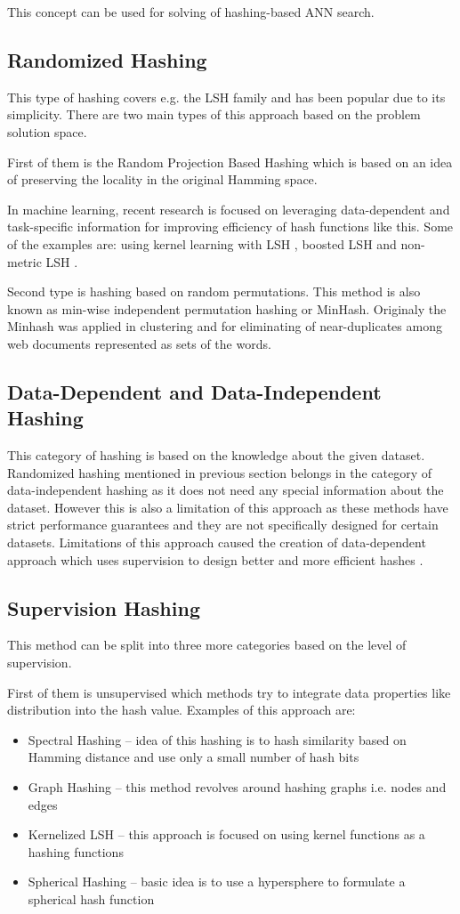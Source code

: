 This concept can be used for solving of hashing-based ANN search.

\subsection{Randomized Hashing}
This type of hashing covers e.g. the LSH family and has been popular due to its simplicity. There are two main types of this approach based on the problem solution space. 

First of them is the Random Projection Based Hashing which is based on an idea of preserving the locality in the original Hamming space.

In machine learning, recent research is focused on leveraging data-dependent and task-specific information for improving efficiency of hash functions like this. Some of the examples are: using kernel learning with LSH \cite{kernelLSH}, boosted LSH \cite{boostLSH} and non-metric LSH \cite{nonMLSH}.

Second type is hashing based on random permutations. This method is also known as min-wise independent permutation hashing or MinHash. Originaly the Minhash was applied in clustering and for eliminating of near-duplicates among web documents represented as sets of the words. \cite{minhashuse}

\subsection{Data-Dependent and Data-Independent Hashing}
This category of hashing is based on the knowledge about the given dataset. Randomized hashing mentioned in previous section belongs in the category of data-independent hashing as it does not need any special information about the dataset. However this is also a limitation of this approach as these methods have strict performance guarantees and they are not specifically designed for certain datasets. Limitations of this approach caused the creation of data-dependent approach which uses supervision to design better and more efficient hashes \cite{learnHash}.

\subsection{Supervision Hashing}
This method can be split into three more categories based on the level of supervision.

First of them is unsupervised which methods try to integrate data properties like distribution into the hash value. Examples of this approach are: 
\begin{itemize}
\item Spectral Hashing -- idea of this hashing is to hash similarity based on Hamming distance and use only a small number of hash bits
\item Graph Hashing -- this method revolves around hashing graphs i.e. nodes and edges
\item Kernelized LSH -- this approach is focused on using kernel functions as a hashing functions
\item Spherical Hashing -- basic idea is to use a hypersphere to formulate a spherical hash function
\end{itemize}

